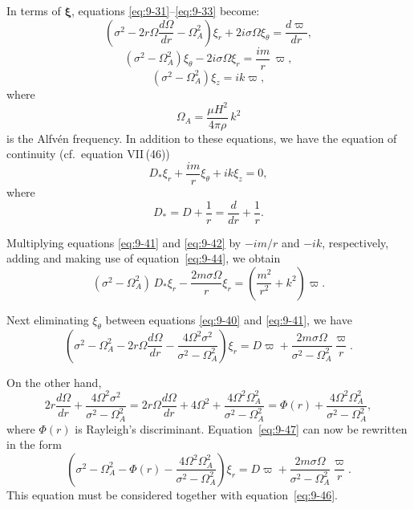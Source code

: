In terms of $\boldsymbol{\xi}$, equations \eqref{eq:9-31}--\eqref{eq:9-33} become:
\begin{equation}
\left(\sigma^2 - 2r\Omega\frac{d\Omega}{dr} - \Omega_A^2\right)\xi_r + 2i\sigma\Omega\xi_\theta = \frac{d\varpi}{dr}, \label{eq:9-40}
\end{equation}
\begin{equation}
(\sigma^2 - \Omega_A^2)\xi_\theta - 2i\sigma\Omega\xi_r = \frac{im}{r}\,\varpi, \label{eq:9-41}
\end{equation}
\begin{equation}
(\sigma^2 - \Omega_A^2)\xi_z = ik\varpi, \label{eq:9-42}
\end{equation}
where
\begin{equation}
\Omega_A = \frac{\mu H^2}{4\pi\rho}\, k^2 \label{eq:9-43}
\end{equation}
is the Alfv\'en frequency. In addition to these equations, we have the equation of continuity (cf.\ equation VII\,(46))
\begin{equation}
D_*\xi_r + \frac{im}{r}\xi_\theta + ik\xi_z = 0, \label{eq:9-44}
\end{equation}
where
\begin{equation}
D_* = D + \frac{1}{r} = \frac{d}{dr} + \frac{1}{r}. \label{eq:9-45}
\end{equation}

Multiplying equations \eqref{eq:9-41} and \eqref{eq:9-42} by $-im/r$ and $-ik$, respectively, adding and making use of equation~\eqref{eq:9-44}, we obtain
\begin{equation}
(\sigma^2 - \Omega_A^2)\, D_*\xi_r - \frac{2m\sigma\Omega}{r}\xi_r = \left(\frac{m^2}{r^2} + k^2\right)\varpi. \label{eq:9-46}
\end{equation}

Next eliminating $\xi_\theta$ between equations \eqref{eq:9-40} and \eqref{eq:9-41}, we have
\begin{equation}
\left(\sigma^2 - \Omega_A^2 - 2r\Omega\frac{d\Omega}{dr} - \frac{4\Omega^2\sigma^2}{\sigma^2 - \Omega_A^2}\right)\xi_r = D\varpi + \frac{2m\sigma\Omega}{\sigma^2 - \Omega_A^2}\frac{\varpi}{r}. \label{eq:9-47}
\end{equation}

On the other hand,
\begin{equation}
2r\frac{d\Omega}{dr} + \frac{4\Omega^2\sigma^2}{\sigma^2 - \Omega_A^2} = 2r\Omega\frac{d\Omega}{dr} + 4\Omega^2 + \frac{4\Omega^2\Omega_A^2}{\sigma^2 - \Omega_A^2} = \Phi(r) + \frac{4\Omega^2\Omega_A^2}{\sigma^2 - \Omega_A^2}, \label{eq:9-48}
\end{equation}
where $\Phi(r)$ is Rayleigh's discriminant. Equation~\eqref{eq:9-47} can now be rewritten in the form
\begin{equation}
\left(\sigma^2 - \Omega_A^2 - \Phi(r) - \frac{4\Omega^2\Omega_A^2}{\sigma^2 - \Omega_A^2}\right)\xi_r = D\varpi + \frac{2m\sigma\Omega}{\sigma^2 - \Omega_A^2}\frac{\varpi}{r}. \label{eq:9-49}
\end{equation}
This equation must be considered together with equation~\eqref{eq:9-46}.

